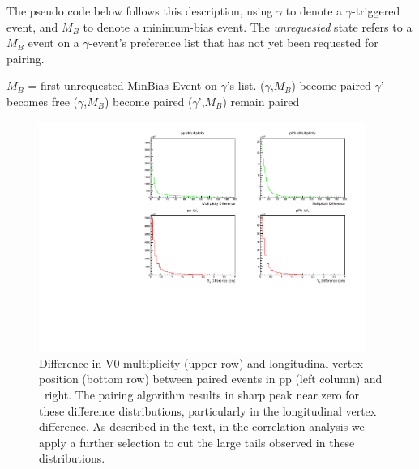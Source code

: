 The pseudo code below follows this description, using \(\gamma\) to denote a \(\gamma\)-triggered event, and \(M_B\) to denote a minimum-bias event. The \textit{unrequested} state refers to a \(M_B\) event on a \(\gamma\)-event's preference list that has not yet been requested for pairing.\\

\FloatBarrier
\begin{algorithmic}
\State \(M_B\) = first unrequested MinBias Event on \(\gamma\)'s list.
\State (\(\gamma\),\(M_B\)) become paired
%
    \State \(\gamma\)' becomes free
    \State (\(\gamma\),\(M_B\)) become paired
    \Else
    \State (\(\gamma\)',\(M_B\)) remain paired
    \EndIf
\EndIf
\EndWhile
\EndProcedure
\end{algorithmic}

\begin{figure}[h]
\center
\includegraphics[width=0.95\textwidth]{EventMixing/pPb_Differences.pdf}
\caption{Difference in V0 multiplicity
(upper row) and longitudinal vertex position (bottom row) between paired events in pp (left column) and \pPb~right. The pairing algorithm results in sharp peak near zero for these difference distributions, particularly in the longitudinal vertex difference. As described in the text, in the correlation analysis we apply a further selection to cut the large tails observed in these distributions. }
\label{Difference_distributions}
\end{figure}

